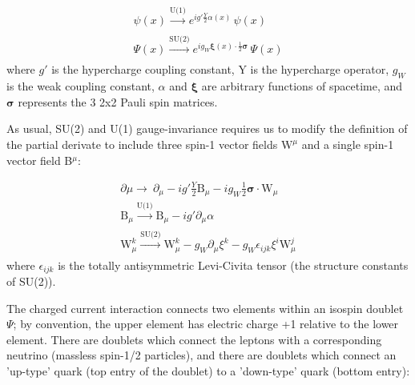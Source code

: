 \begin{equation}
\begin{array}{l}
\psi(x) \xrightarrow[]{\text{U(1)}} e^{i g' \frac{Y}{2} \alpha(x)} \, \psi(x) \\
\Psi(x) \xrightarrow[]{\text{SU(2)}} e^{i g_{W} \bm{\xi}(x) \cdot \frac{1}{2} \bm{\sigma} } \, \Psi(x) 
\end{array}
\end{equation}
where $g'$ is the hypercharge coupling constant, Y is the hypercharge operator, $g_{W}$ is the weak coupling constant, $\alpha$ and $\bm{\xi}$ are arbitrary functions of spacetime, and $\bm{\sigma}$ represents the 3 2x2 Pauli spin matrices.

As usual, SU(2) and U(1) gauge-invariance requires us to modify the definition of the partial derivate to include three spin-1 vector fields $\bm{\mathrm{W}}^{\mu}$ and a single spin-1 vector field B$^{\mu}$:

\begin{equation}
\begin{array}{l}
\partial{\mu} \rightarrow\ \partial_{\mu} - i g' \frac{Y}{2}\mathrm{B}_{\mu} -  i g_{W} \frac{1}{2}\bm{\sigma} \cdot \bm{\mathrm{W}}_{\mu}\\
\mathrm{B}_{\mu} \xrightarrow[]{\text{U(1)}} \mathrm{B}_{\mu} - i g' \partial_{\mu} \alpha \\
\mathrm{W}^{k}_{\mu} \xrightarrow[]{\text{SU(2)}} \mathrm{W}^{k}_{\mu} - g_{W} \partial_{\mu} \xi^{k} -  g_{W} \epsilon_{ijk} \xi^{i} \mathrm{W}^{j}_{\mu}
 \end{array}
\end{equation}
where $\epsilon_{ijk}$ is the totally antisymmetric Levi-Civita tensor (the structure constants of SU(2)).

The charged current interaction connects two elements within an isospin doublet $\Psi$; by convention, the upper element has electric charge +1 relative to the lower element. There are doublets which connect the leptons with a corresponding neutrino (massless spin-1/2 particles), and there are doublets which connect an 'up-type' quark (top entry of the doublet) to a 'down-type' quark (bottom entry):

